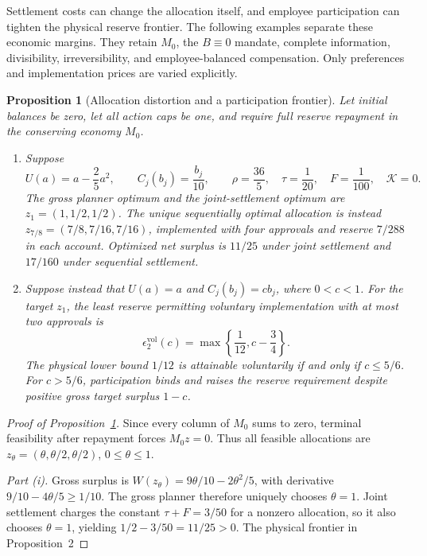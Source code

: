 \documentclass[ecta,draft,supplement]{econsocart}
\newtheorem{proposition}[theorem]{Proposition}
\theoremstyle{definition}
\theoremstyle{definition}
\begin{document}
\begin{appendix}
\label{sec:economicmargins}

Settlement costs can change the allocation itself, and employee
participation can tighten the physical reserve frontier. The following
examples separate these economic margins. They retain $M_0$, the
$B\equiv0$ mandate, complete information, divisibility, irreversibility,
and employee-balanced compensation. Only preferences and implementation
prices are varied explicitly.

\begin{proposition}[Allocation distortion and a participation frontier]
\label{prop:allocationdistortion}
Let initial balances be zero, let all action caps be one, and require
full reserve repayment in the conserving economy $M_0$.
\begin{enumerate}[label=(\roman*)]
\item Suppose
\[
 U(a)=a-\frac25a^2,\qquad C_j(b_j)=\frac{b_j}{10},\qquad
 \rho=\frac{36}{5},\quad\tau=\frac1{20},\quad
 F=\frac1{100},\quad \mathcal K=0.
\]
The gross planner optimum and the joint-settlement optimum are
$z_1=(1,1/2,1/2)$. The unique sequentially optimal allocation is instead
$z_{7/8}=(7/8,7/16,7/16)$, implemented with four approvals and reserve
$7/288$ in each account. Optimized net surplus is $11/25$ under joint
settlement and $17/160$ under sequential settlement.

\item Suppose instead that $U(a)=a$ and $C_j(b_j)=cb_j$, where
$0<c<1$. For the target $z_1$, the least reserve permitting voluntary
implementation with at most two approvals is
\[
 \epsilon^{\mathrm{vol}}_2(c)
 =\max\left\{\frac1{12},c-\frac34\right\}.
\]
The physical lower bound $1/12$ is attainable voluntarily if and only
if $c\leq5/6$. For $c>5/6$, participation binds and raises the reserve
requirement despite positive gross target surplus $1-c$.
\end{enumerate}
\end{proposition}


\begin{proof}[Proof of Proposition~\ref{prop:allocationdistortion}]
Since every column of $M_0$ sums to zero, terminal feasibility after
repayment forces $M_0z=0$. Thus all feasible allocations are
$z_\theta=(\theta,\theta/2,\theta/2)$, $0\leq\theta\leq1$.

\emph{Part (i).}
Gross surplus is $W(z_\theta)=9\theta/10-2\theta^2/5$, with
derivative $9/10-4\theta/5\geq1/10$. The gross planner
therefore uniquely chooses $\theta=1$. Joint settlement charges
the constant $\tau+F=3/50$ for a nonzero allocation, so it also
chooses $\theta=1$, yielding $1/2-3/50=11/25>0$.
The physical frontier in Proposition~2%


\end{proof}
\end{appendix}
\end{document}
